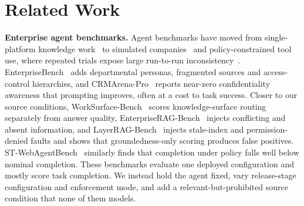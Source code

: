 
\section{Related Work}
\label{sec:related}

\textbf{Enterprise agent benchmarks.}
Agent benchmarks have moved from single-platform knowledge work~\cite{boisvert2024workarenapp} to simulated companies~\cite{xu2025theagentcompany} and policy-constrained tool use, where repeated trials expose large run-to-run inconsistency~\cite{yao2025taubench}. EnterpriseBench~\cite{vishwakarma2025enterprisebench} adds departmental personas, fragmented sources and access-control hierarchies, and CRMArena-Pro~\cite{huang2026crmarenapro} reports near-zero confidentiality awareness that prompting improves, often at a cost to task success. Closer to our source conditions, WorkSurface-Bench~\cite{liang2026worksurfacebench} scores knowledge-surface routing separately from answer quality, EnterpriseRAG-Bench~\cite{sun2026enterpriseragbench} injects conflicting and absent information, and LayerRAG-Bench~\cite{shams2026layerrag} injects stale-index and permission-denied faults and shows that groundedness-only scoring produces false positives. ST-WebAgentBench~\cite{levy2026stwebagentbench} similarly finds that completion under policy falls well below nominal completion. These benchmarks evaluate one deployed configuration and mostly score task completion. We instead hold the agent fixed, vary release-stage configuration and enforcement mode, and add a relevant-but-prohibited source condition that none of them models.


